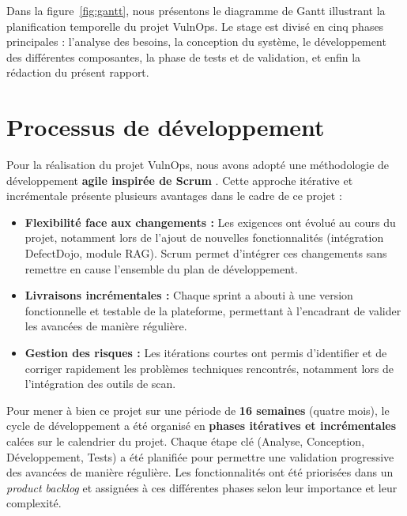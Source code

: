 \documentclass[12pt, a4paper, oneside]{report}
\begin{document}
Dans la figure~\ref{fig:gantt}, nous présentons le diagramme de Gantt illustrant
la planification temporelle du projet VulnOps. Le stage est divisé en cinq phases
principales : l'analyse des besoins, la conception du système, le développement
des différentes composantes, la phase de tests et de validation, et enfin la
rédaction du présent rapport.

\section{Processus de développement}
\label{sec:processus}

Pour la réalisation du projet VulnOps, nous avons adopté une méthodologie de
développement \textbf{agile inspirée de Scrum} \cite{scrumguide}. Cette approche
itérative et incrémentale présente plusieurs avantages dans le cadre de ce projet :

\begin{itemize}
    \item \textbf{Flexibilité face aux changements :} Les exigences ont évolué
    au cours du projet, notamment lors de l'ajout de nouvelles fonctionnalités
    (intégration DefectDojo, module RAG). Scrum permet d'intégrer ces changements
    sans remettre en cause l'ensemble du plan de développement.
    
    \item \textbf{Livraisons incrémentales :} Chaque sprint a abouti à une version
    fonctionnelle et testable de la plateforme, permettant à l'encadrant de valider
    les avancées de manière régulière.
    
    \item \textbf{Gestion des risques :} Les itérations courtes ont permis
    d'identifier et de corriger rapidement les problèmes techniques rencontrés,
    notamment lors de l'intégration des outils de scan.
\end{itemize}

Pour mener à bien ce projet sur une période de \textbf{16 semaines} (quatre mois), le cycle de développement a été organisé en \textbf{phases itératives et incrémentales} calées sur le calendrier du projet. Chaque étape clé (Analyse, Conception, Développement, Tests) a été planifiée pour permettre une validation progressive des avancées de manière régulière. Les fonctionnalités ont été priorisées dans un \textit{product backlog} et assignées à ces différentes phases selon leur importance et leur complexité.
\end{document}
